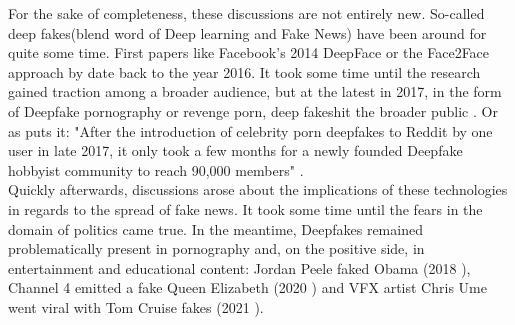 \documentclass[
  a4paper,  %
  twoside,  %
  bibliography=totoc,
  headsepline,
  cleardoublepage=empty,
  parskip=half,
  draft=false
]{scrbook}
\begin{document}
For the sake of completeness, these discussions are not entirely new. So-called deep fakes(blend word of Deep learning and Fake News) have been around for quite some time. First papers like Facebook's 2014 DeepFace \cite{taigmanDeepFaceClosingGap2014} or the Face2Face approach by \citet{thiesFace2FaceRealtimeFace2020} date back to the year 2016. It took some time until the research gained traction among a broader audience, but at the latest in 2017, in the form of Deepfake pornography or revenge porn, deep fakeshit the broader public \cite{coleAIAssistedFakePorn2017}. Or as \citeauthor{westerlundEmergenceDeepfakeTechnology2019a} puts it: "After the introduction of celebrity porn deepfakes to Reddit by one user in late 2017, it only took a few months for a newly founded Deepfake hobbyist community to reach 90,000 members" \cite{westerlundEmergenceDeepfakeTechnology2019a}. \\
Quickly afterwards, discussions arose about the implications of these technologies in regards to the spread of fake news. It took some time until the fears in the domain of politics came true. In the meantime, Deepfakes remained problematically present in pornography and, on the positive side, in entertainment and educational content: Jordan Peele faked Obama (2018 \cite{vincentWatchJordanPeele2018}), Channel 4 emitted a fake Queen Elizabeth (2020 \cite{DeepfakeQueenDeliver2020}) and VFX artist Chris Ume went viral with Tom Cruise fakes (2021 \cite{vincentTomCruiseDeepfake2021}).
\end{document}
